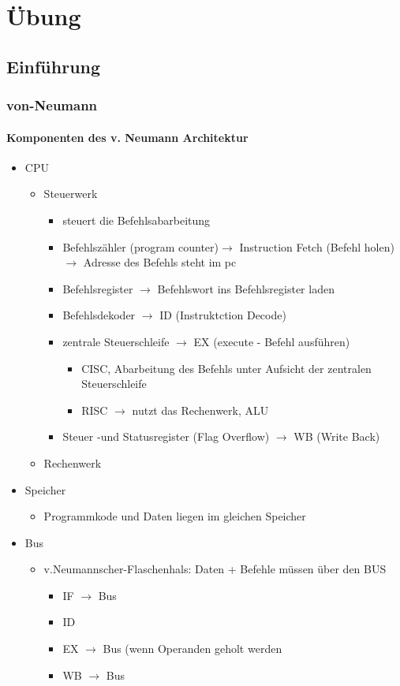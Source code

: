 
\chapter{Übung}
\section{Einführung}
\subsection{von-Neumann}
\subsubsection{Komponenten des v. Neumann Architektur}
	\begin{itemize}
		\item CPU
		\begin{itemize}
			\item Steuerwerk
			\begin{itemize}
				\item steuert die Befehlsabarbeitung
				\item Befehlszähler (program counter)\(\to\) Instruction Fetch (Befehl holen) \\ \(\to\) Adresse des Befehls steht im pc		
				\item Befehlsregister \(\to\) Befehlswort ins Befehlsregister laden
				\item Befehlsdekoder \(\to\) ID (Instruktction Decode)
				\item zentrale Steuerschleife \(\to\) EX (execute - Befehl ausführen)
				\begin{itemize}
					\item CISC, Abarbeitung des Befehls unter Aufsicht der zentralen Steuerschleife
					\item RISC \(\to\) nutzt das Rechenwerk, ALU
				\end{itemize}
				\item Steuer -und Statusregister (Flag Overflow) \(\to\) WB (Write Back)
			\end{itemize}
			\item Rechenwerk
		\end{itemize}
		\item Speicher
		\begin{itemize}
			\item Programmkode und Daten liegen im gleichen Speicher
		\end{itemize}
		\item Bus
		\begin{itemize}
			\item v.Neumannscher-Flaschenhals: Daten + Befehle müssen über den BUS
			\begin{itemize}
				\item IF \(\to\) Bus
				\item ID
				\item EX \(\to\) Bus (wenn Operanden geholt werden
				\item WB \(\to\) Bus
			\end{itemize}
		\end{itemize}
	\end{itemize}
